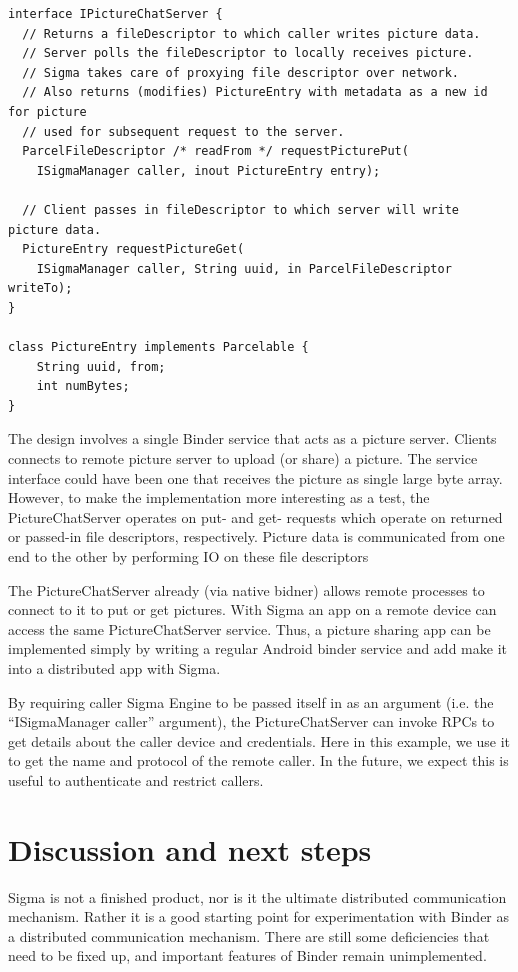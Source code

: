 \documentclass[prodmode]{acmlarge}
\begin{document}
\begin{Verbatim}[samepage=true]
interface IPictureChatServer {
  // Returns a fileDescriptor to which caller writes picture data.
  // Server polls the fileDescriptor to locally receives picture.
  // Sigma takes care of proxying file descriptor over network.
  // Also returns (modifies) PictureEntry with metadata as a new id for picture
  // used for subsequent request to the server.
  ParcelFileDescriptor /* readFrom */ requestPicturePut(
    ISigmaManager caller, inout PictureEntry entry);

  // Client passes in fileDescriptor to which server will write picture data.
  PictureEntry requestPictureGet(
    ISigmaManager caller, String uuid, in ParcelFileDescriptor writeTo);
}

class PictureEntry implements Parcelable {
    String uuid, from;
    int numBytes;
}
\end{Verbatim}

The design involves a single Binder service that acts as a picture server. Clients connects to remote picture server to upload (or share) a picture. The service interface could have been one that receives the picture as single large byte array. However, to make the implementation more interesting as a test, the PictureChatServer operates on put- and get- requests which operate on returned or passed-in file descriptors, respectively. Picture data is communicated from one end to the other by performing IO on these file descriptors

The PictureChatServer already (via native bidner) allows remote processes to connect to it to put or get pictures. With Sigma an app on a remote device can access the same PictureChatServer service. Thus, a picture sharing app can be implemented simply by writing a regular Android binder service and add make it into a distributed app with Sigma.

By requiring caller Sigma Engine to be passed itself in as an argument (i.e. the ``ISigmaManager caller'' argument), the PictureChatServer can invoke RPCs to get details about the caller device and credentials. Here in this example, we use it to get the name and protocol of the remote caller. In the future, we expect this is useful to authenticate and restrict callers.

\section{Discussion and next steps}
Sigma is not a finished product, nor is it the ultimate distributed communication mechanism. Rather it is a good starting point for experimentation with Binder as a distributed communication mechanism. There are still some deficiencies that need to be fixed up, and important features of Binder remain unimplemented.
\end{document}
